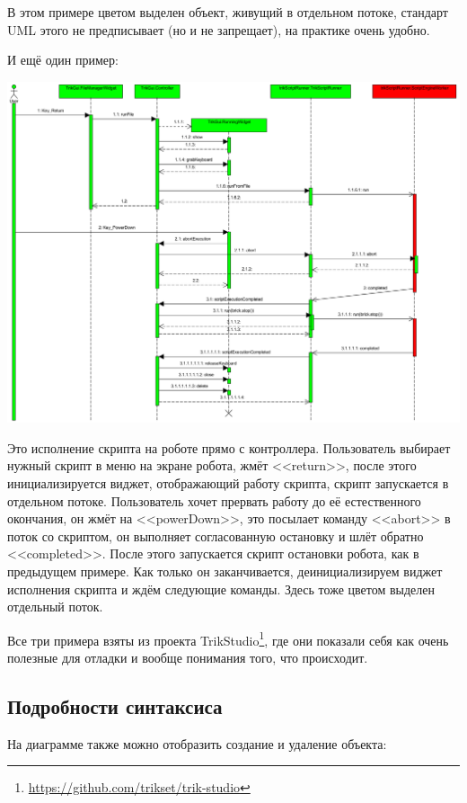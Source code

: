 \documentclass{../mcstext}
\begin{document}
В этом примере цветом выделен объект, живущий в отдельном потоке, стандарт UML этого не предписывает (но и не запрещает), на практике очень удобно.

И ещё один пример:

\begin{center}
    \includegraphics[width=\textwidth]{sequenceDiagramExample3.png}
\end{center}

Это исполнение скрипта на роботе прямо с контроллера. Пользователь выбирает нужный скрипт в меню на экране робота, жмёт <<return>>, после этого инициализируется виджет, отображающий работу скрипта, скрипт запускается в отдельном потоке. Пользователь хочет прервать работу до её естественного окончания, он жмёт на <<powerDown>>, это посылает команду <<abort>> в поток со скриптом, он выполняет согласованную остановку и шлёт обратно <<completed>>. После этого запускается скрипт остановки робота, как в предыдущем примере. Как только он заканчивается, деинициализируем виджет исполнения скрипта и ждём следующие команды. Здесь тоже цветом выделен отдельный поток.

Все три примера взяты из проекта TrikStudio\footnote{\url{https://github.com/trikset/trik-studio}}, где они показали себя как очень полезные для отладки и вообще понимания того, что происходит.

\subsection{Подробности синтаксиса}

На диаграмме также можно отобразить создание и удаление объекта:
\end{document}
